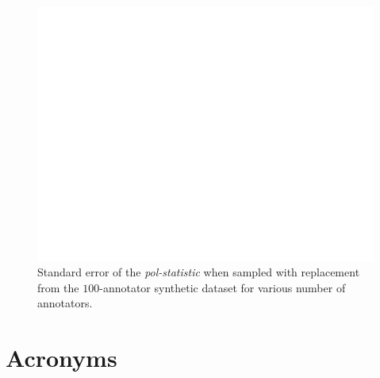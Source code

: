 \documentclass{article}
\begin{document}
\begin{figure}
	\includegraphics[width=\linewidth]{ndfu_std_error_sample_size.png}
	\caption{Standard error of the \textit{pol-statistic} when sampled with replacement from the $100$-annotator synthetic dataset for various number of annotators.}
	\label{fig::std_error}
\end{figure}


\section{Acronyms}

\begin{acronym}[WWW]
\end{acronym}

\printbibliography
\end{document}
